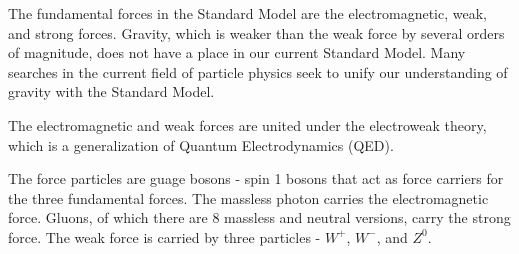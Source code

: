 The fundamental forces in the Standard Model are the electromagnetic, weak, and strong forces. Gravity, which is weaker than the weak force by several orders of magnitude, does not have a place in our current Standard Model. Many searches in the current field of particle physics seek to unify our understanding of gravity with the Standard Model. 

The electromagnetic and weak forces are united under the electroweak theory, which is a generalization of Quantum Electrodynamics (QED).

The force particles are guage bosons - spin 1 bosons that act as force carriers for the three fundamental forces. The massless photon carries the electromagnetic force. Gluons, of which there are 8 massless and neutral versions, carry the strong force. The weak force is carried by three particles - $W^+$, $W^-$, and $Z^0$. 

